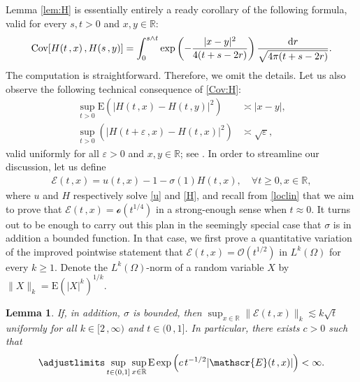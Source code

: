 \documentclass[reqno]{amsart}
\DeclareMathOperator{\Cov}{Cov}
\newcommand{\<}{\langle}
\renewcommand{\>}{\rangle}
\newcommand{\R}{\mathbb{R}}
\newcommand{\E}{\mathrm{E}}
\newcommand{\1}{\mathbb{1}}
\renewcommand{\d}{{\rm d}}
\renewcommand{\ge}{\geqslant}
\newtheorem{lemma}[stat]{Lemma}
\theoremstyle{definition}
\numberwithin{equation}{section}
\begin{document}
Lemma \ref{lem:H} is essentially entirely a ready corollary of the following
formula, valid for every $s,t>0$ and $x,y\in\R$:
\begin{equation}\label{Cov:H}
	\Cov[H(t\,,x)\,,H(s\,,y)] 
	=\int_0^{s\wedge t}\exp\left( -
	\frac{|x-y|^2}{4(t+s-2r)}\right)
	\frac{\d r}{\sqrt{4\pi(t+s-2r)}}.
\end{equation}
The computation is straightforward. Therefore, we omit the details.
Let us also observe the following technical consequence of
\eqref{Cov:H}: 
\begin{equation}\label{H-H}\begin{split}
	\sup_{t>0}\E\left(|H(t\,,x)-H(t\,,y)|^2\right) &\asymp |x-y|,\\
	\sup_{t>0}\left( | H(t+\varepsilon\,,x) - H(t\,,x)|^2\right)
		&\asymp \sqrt{\varepsilon},
\end{split}\end{equation}
valid uniformly for all $\varepsilon>0$
and $x,y\in\R$; see \cite[\S3]{CBMS}.
In order to streamline our discussion, let us define 
\begin{align}\label{E(t,x)}
	\mathscr{E}(t\,,x) = u(t\,,x) - 1 - \sigma(1)H(t\,,x), \quad \forall t \ge 0, x \in \R,
\end{align}
where $u$ and $H$ respectively solve \eqref{u}
and \eqref{H}, and recall from \eqref{loclin} that
we aim to prove that $\mathscr{E}(t\,,x) = \mathscr{o}(t^{1/4})$
in a strong-enough sense when $t\approx0$. It turns out to be enough to 
carry out this plan in the seemingly special case that $\sigma$ is
in addition a bounded function. In that case,
we first prove a quantitative variation of
the improved pointwise statement that 
$\mathscr{E}(t\,,x) = \mathcal{O}(t^{1/2})$ in $L^k(\Omega)$
for every $k\ge1$.
Denote the $L^k(\Omega)$-norm of a random variable $X$ by $\|X\|_k = \E(|X|^k)^{1/k}$.

\begin{lemma}\label{lem:L_k:E}
	If, in addition, $\sigma$ is bounded, then
	$\sup_{x\in\R}\|\mathscr{E}(t\,,x)\|_k \lesssim k\sqrt{t}$
	uniformly for all $k \in [2\,,\infty)$ and $t \in (0\,,1]$.
	In particular, there exists $c>0$ such that
	\[
		\adjustlimits\sup_{t\in(0,1]}
		\sup_{x\in\R}\E\exp\left( c\, t^{-1/2}|\mathscr{E}(t\,,x)|\right)<\infty.
	\]
\end{lemma}
\end{document}
